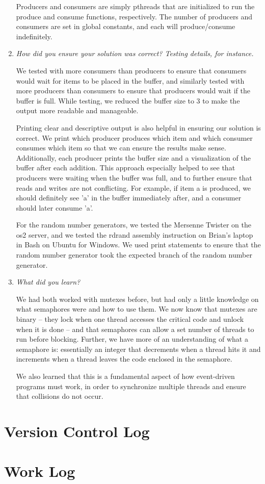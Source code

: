 \documentclass[letterpaper, onecolumn, draftclsnofoot, 10pt, compsoc]{IEEEtran}
\begin{document}
\begin{singlespace}
\begin{enumerate}
            Producers and consumers are simply pthreads that are initialized to run the produce and consume functions, respectively. The number of producers and consumers are set in global constants, and each will produce/consume indefinitely.\par
            \par
            \item \textit{How did you ensure your solution was correct? Testing details, for instance.}\par
            We tested with more consumers than producers to ensure that consumers would wait for items to be placed in the buffer, and similarly tested with more producers than consumers to ensure that producers would wait if the buffer is full. While testing, we reduced the buffer size to 3 to make the output more readable and manageable.\par
             Printing clear and descriptive output is also helpful in ensuring our solution is correct. We print which producer produces which item and which consumer consumes which item so that we can ensure the results make sense. Additionally, each producer prints the buffer size and a visualization of the buffer after each addition. This approach especially helped to see that producers were waiting when the buffer was full, and to further ensure that reads and writes are not conflicting. For example, if item a is produced, we should definitely see 'a' in the buffer immediately after, and a consumer should later consume 'a'.\par
For the random number generators, we tested the Mersenne Twister on the os2 server, and we tested the rdrand assembly instruction on Brian's laptop in Bash on Ubuntu for Windows. We used print statements to ensure that the random number generator took the expected branch of the random number generator.
\item \textit{What did you learn?}\par
We had both worked with mutexes before, but had only a little knowledge on what semaphores were and how to use them. We now know that mutexes are binary -- they lock when one thread accesses the critical code and unlock when it is done -- and that semaphores can allow a set number of threads to run before blocking. Further, we have more of an understanding of what a semaphore is: essentially an integer that decrements when a thread hits it and increments when a thread leaves the code enclosed in the semaphore.\par
            
We also learned that this is a fundamental aspect of how event-driven programs must work, in order to synchronize multiple threads and ensure that collisions do not occur.
            \par
        \end{enumerate}
    \end{singlespace}
\section{Version Control Log}

\section{Work Log}

%


\end{document}
